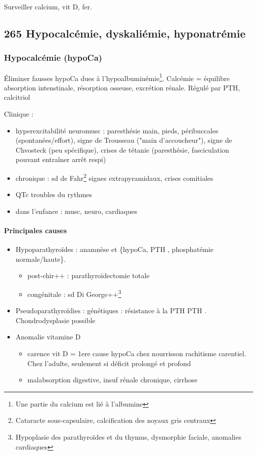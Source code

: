 \documentclass[11pt]{article}
\begin{document}
Surveiller calcium, vit D, fer.

\subsection{265 \textdagger{} Hypocalcémie, dyskaliémie, hyponatrémie}
\label{sec:orgf6f128d}

\subsubsection{Hypocalcémie (hypoCa)}
\label{sec:org37a12e4}
Éliminer fausses hypoCa dues à l'hypoalbuminémie\footnote{Une partie du calcium est lié à l'albumine}.
Calcémie = équilibre absorption intenstinale, résorption osseuse, excrétion
rénale. Régulé par PTH, calcitriol

Clinique : 
\begin{itemize}
\item hyperexcitabilité neuromusc : paresthésie main, pieds, péribuccales
(spontanées/effort), signe de Trousseau ("main d'accoucheur"), signe de
Chvosteck (peu spécifique), crises de tétanie (paresthésie, fasciculation
pouvant entraîner arrêt respi)
\item chronique : sd de Fahr\footnote{Cataracte sous-capsulaire, calcification des noyaux gris centraux} \thus signes extrapyramidaux, crises comitiales
\item \inc QTc \thus troubles du rythmes
\item dans l'enfance : musc, neuro, cardiaques
\end{itemize}

\paragraph{Principales causes}
\label{sec:orgd9a18c3}
\begin{itemize}
\item Hypoparathyroïdes : anamnèse et \{hypoCa, PTH \dec, phosphatémie
normale/haute\}.
\begin{itemize}
\item post-chir++ : parathyroïdectomie totale
\item congénitale : sd Di George++\footnote{Hypoplasie des parathyroïdes et du thymus, dysmorphie faciale, anomalies cardiaques}
\end{itemize}
\item Pseudoparathyroïdies : génétiques : résistance à la PTH \thus PTH
\inc. Chondrodysplasie possible
\item Anomalie vitamine D
\begin{itemize}
\item carence vit D = 1ere cause hypoCa chez nourrisson \thus rachitisme
carentiel. Chez l'adulte, seulement si déficit prolongé et profond
\item malabsorption digestive, insuf rénale chronique, cirrhose
\end{itemize}
\end{itemize}
\end{document}
